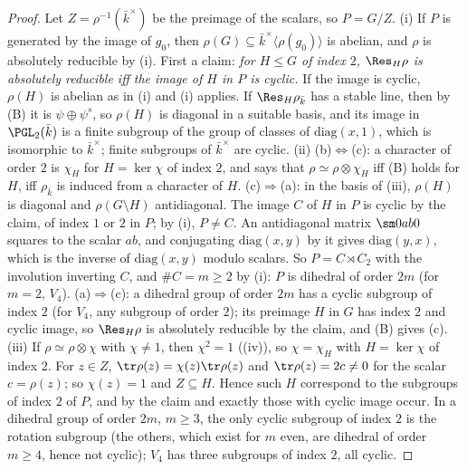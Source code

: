 \begin{proof}
Let $Z=\rho^{-1}(\bar k^\times)$ be the preimage of the scalars, so $P=G/Z$. (i) If $P$ is generated by the image of $g_0$, then $\rho(G)\subseteq\bar k^\times\langle\rho(g_0)\rangle$
is abelian, and $\rho$ is absolutely reducible by (i).
First a claim: \emph{for $H\le G$ of index $2$, $\Res_H\rho$ is absolutely reducible iff the image of $H$ in $P$ is cyclic.} If the image is cyclic,
$\rho(H)$ is abelian as in (i) and (i) applies. If $\Res_H\rho_{\bar k}$ has a stable line, then by
(B) it is $\psi\oplus\psi^s$, so $\rho(H)$ is diagonal in a suitable basis, and its image in $\PGL_2(\bar k)$ is a finite
subgroup of the group of classes of $\mathrm{diag}(x,1)$, which is isomorphic to $\bar k^\times$; finite subgroups of $\bar k^\times$ are cyclic.
(ii) (b)$\Leftrightarrow$(c): a character of order $2$ is $\chi_H$ for $H=\ker\chi$ of index $2$, and  says that
$\rho\simeq\rho\otimes\chi_H$ iff (B) holds for $H$, iff $\rho_{\bar k}$ is induced from a character of $H$. (c)$\Rightarrow$(a): in the basis of
(iii), $\rho(H)$ is diagonal and $\rho(G\setminus H)$ antidiagonal. The image $C$ of $H$ in $P$ is cyclic by the claim, of index
$1$ or $2$ in $P$; by (i), $P\ne C$. An antidiagonal matrix $\sm0ab0$ squares to the scalar $ab$, and conjugating $\mathrm{diag}(x,y)$ by it gives
$\mathrm{diag}(y,x)$, which is the inverse of $\mathrm{diag}(x,y)$ modulo scalars. So $P=C\rtimes C_2$ with the involution inverting $C$, and $\#C=m\ge2$ by
(i): $P$ is dihedral of order $2m$ (for $m=2$, $V_4$). (a)$\Rightarrow$(c): a dihedral group of order $2m$ has a cyclic subgroup of index $2$
(for $V_4$, any subgroup of order $2$); its preimage $H$ in $G$ has index $2$ and cyclic image, so $\Res_H\rho$ is absolutely reducible by the
claim, and (B) gives (c).
(iii) If $\rho\simeq\rho\otimes\chi$ with $\chi\ne1$, then $\chi^2=1$ ((iv)), so $\chi=\chi_H$ with $H=\ker\chi$ of index $2$. For $z\in Z$,
$\tr\rho(z)=\chi(z)\tr\rho(z)$ and $\tr\rho(z)=2c\ne0$ for the scalar $c=\rho(z)$; so $\chi(z)=1$ and $Z\subseteq H$. Hence such $H$ correspond to the
subgroups of index $2$ of $P$, and by the claim and  exactly those with cyclic image occur. In a dihedral
group of order $2m$, $m\ge3$, the only cyclic subgroup of index $2$ is the rotation subgroup (the others, which exist for $m$ even, are
dihedral of order $m\ge4$, hence not cyclic); $V_4$ has three subgroups of index $2$, all cyclic.
\end{proof}

